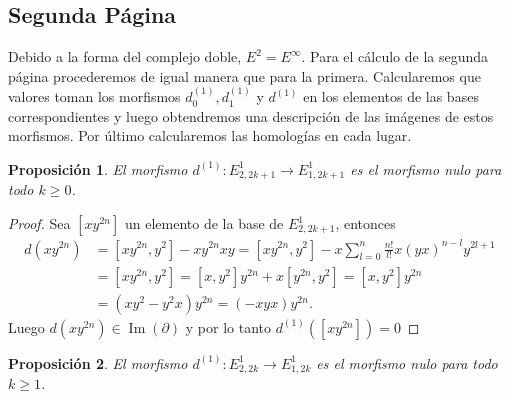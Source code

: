 \documentclass[a4paper,oneside,fleqn,11pt]{article}
\newtheorem{prop}{Proposición}
\numberwithin{prop}{subsection}
\DeclareMathOperator\Ima{Im}
\begin{document}
\subsection{Segunda Página}
Debido a la forma del complejo doble, $E^2 = E^{\infty}$. Para el cálculo de la segunda página procederemos de igual manera que para la primera. Calcularemos
que valores toman los morfismos $d_0^{(1)}, d_1^{(1)}$ y $d^{(1)}$ en los elementos de las bases correspondientes y luego obtendremos una descripción
de las imágenes de estos morfismos. Por último calcularemos las homologías en cada lugar.
\begin{prop} El morfismo $d^{(1)}: E_{2, 2k + 1}^1 \to E_{1, 2k + 1}^1$ es el morfismo nulo para todo $k \geq 0$.
\end{prop}
\begin{proof}
	Sea $\left[xy^{2n}\right]$ un elemento de la base de $E_{2, 2k + 1}^1$, entonces
	\begin{align*}
		d(xy^{2n}) &= \left[ xy^{2n}, y^2 \right] - xy^{2n}xy
			= \left[ xy^{2n}, y^2 \right] - x\sum_{l = 0}^n\frac{n!}{l!}x(yx)^{n - l}y^{2l + 1}  \\
		&= \left[ xy^{2n}, y^2 \right] = \left[x, y^2 \right]y^{2n} + x\left[y^{2n}, y^2\right] =  \left[x, y^2 \right]y^{2n} \\
		&= (xy^2 - y^2x)y^{2n} = (-xyx)y^{2n}. 
	\end{align*}
	Luego $d(xy^{2n}) \in \Ima(\partial)$ y por lo tanto $d^{(1)}(\left[xy^{2n}\right]) = 0$
	\end{proof}
\begin{prop} El morfismo $d^{(1)}: E_{2, 2k}^1 \to E_{1, 2k}^1$ es el morfismo nulo para todo $k \geq 1$.
\end{prop}
\end{document}
